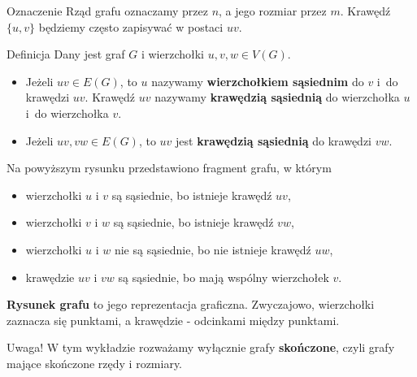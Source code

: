 \documentclass[a4paper,10pt]{beamer}
\begin{document}
\begin{frame}

\begin{block}{Oznaczenie}
Rząd grafu oznaczamy przez $n$, a jego rozmiar przez $m$. Krawędź $\{u,v\}$ będziemy często zapisywać w postaci $uv$.
\end{block}

	\begin{block}{Definicja}
	Dany jest graf $G$ i wierzchołki $u,v,w\in V(G)$.
	\begin{itemize}
		\item Jeżeli $uv\in E(G)$, to $u$ nazywamy {\bf wierzchołkiem sąsiednim} do $v$ i~do krawędzi $uv$. Krawędź $uv$ nazywamy {\bf krawędzią sąsiednią} do wierzchołka $u$ i~do wierzchołka $v$.
		\item Jeżeli $uv,vw\in E(G)$, to $uv$ jest {\bf krawędzią sąsiednią} do krawędzi $vw$.
	\end{itemize}
	\end{block}

\medskip

\begin{center}

\end{center}
Na powyższym rysunku przedstawiono fragment grafu, w którym
\begin{itemize}
\item wierzchołki $u$ i $v$ są sąsiednie, bo istnieje krawędź $uv$,
\item wierzchołki $v$ i $w$ są sąsiednie, bo istnieje krawędź $vw$,
\item wierzchołki $u$ i $w$ nie są sąsiednie, bo nie istnieje krawędź $uw$,
\item krawędzie $uv$ i $vw$ są sąsiednie, bo mają wspólny wierzchołek $v$.
\end{itemize}
\end{frame}


\begin{frame}


	\begin{block}{}
		{\bf Rysunek grafu} to jego reprezentacja graficzna. Zwyczajowo, wierzchołki zaznacza się punktami, a krawędzie - odcinkami między punktami.
	\end{block}

\begin{alertblock}{Uwaga!}
W tym wykładzie rozważamy wyłącznie grafy {\bf skończone}, czyli grafy mające skończone rzędy i rozmiary.
\end{alertblock}
	
\end{frame}
	
\end{document}
